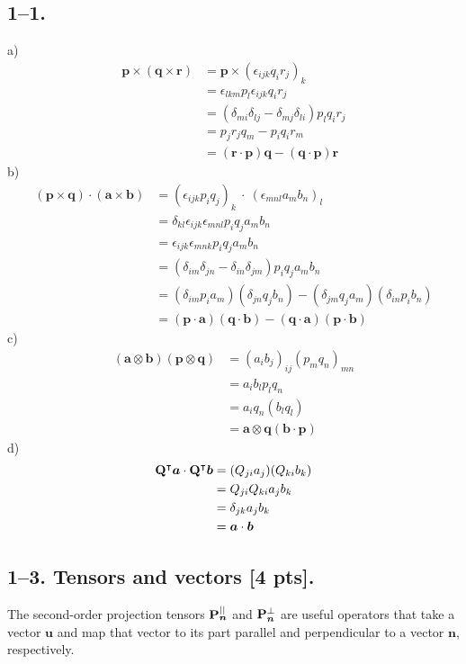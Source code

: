 \subsection*{1--1.}
a)
\begin{align*}
\bm{p} \times (\bm{q} \times \bm{r}) &= \bm{p} \times(\epsilon_{ijk}q_{i}r_{j})_k \\
  &= \epsilon_{lkm}p_{l}\epsilon_{ijk}q_i r_j \\
  &=(\delta_{mi}\delta_{lj}-\delta_{mj}\delta_{li})p_l q_i r_j \\
  &= p_j r_j q_m - p_i q_i r_m \\
  &= (\bm{r} \cdot \bm{p}) \bm{q} - (\bm{q} \cdot \bm{p}) \bm{r}
\end{align*}
b)\ 
\begin{align*}
    (\bm{p} \times \bm{q}) \cdot (\bm{a} \times \bm{b}) &= (\epsilon_{ijk}p_i q_j)_k \ \cdot\ (\epsilon_{mnl}a_m b_n)_l \\
    &= \delta_{kl}\epsilon_{ijk}\epsilon_{mnl}p_i q_ja_m b_n \\ 
    &= \epsilon_{ijk}\epsilon_{mnk}p_i q_ja_m b_n \\
    &= (\delta_{im}\delta_{jn}-\delta_{in}\delta_{jm})p_i q_ja_m b_n \\
    &= (\delta_{im}p_i a_m)(\delta_{jn}q_j b_n) - (\delta_{jm}q_j a_m)(\delta_{in}p_i b_n) \\
    &= (\bm{p} \cdot \bm{a}) (\bm{q} \cdot \bm{b}) - (\bm{q} \cdot \bm{a})(\bm{p} \cdot \bm{b})
\end{align*}
c)
\begin{align*}
    (\bm{a} \otimes \bm{b})(\bm{p} \otimes \bm{q}) &= (a_i b_j)_{ij} (p_m q_n)_{mn} \\
    &= a_ib_lp_lq_n \\
    &= a_iq_n (b_l q_l) \\
    &= \bm{a}\otimes\bm{q}(\bm{b} \cdot \bm{p})
\end{align*}
d)  
\begin{align*}
    \mathbf{Q}^\intercal\bm{a} \cdot \mathbf{Q}^\intercal\bm{b} &= (Q_{ji}a_j) (Q_{ki}b_k) \\
    &= Q_{ji}Q_{ki}a_j b_k \\
    &= \delta_{jk}a_j b_k \\
    &= \bm{a}\cdot\bm{b}
\end{align*}

\subsection*{1--3. \textbf{Tensors and vectors} [4 pts].}
The second-order projection tensors $\mathbf{P}_{\bm{n}}^{||}$ and $\mathbf{P}_{\bm{n}}^{\perp}$ are useful operators that take a vector $\bm{u}$ and map that vector to its part parallel and perpendicular to a vector $\bm{n}$, respectively. 

